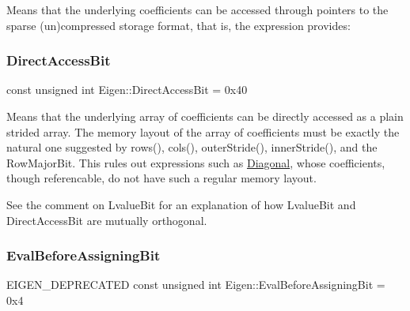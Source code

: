 Means that the underlying coefficients can be accessed through pointers to the sparse (un)compressed storage format, that is, the expression provides\+: 
\begin{DoxyCode}{0}
\end{DoxyCode}
 \mbox{\label{group__flags_gabf1e9d0516a933445a4c307ad8f14915}} 
\subsubsection{\texorpdfstring{DirectAccessBit}{DirectAccessBit}}
{\footnotesize\ttfamily const unsigned int Eigen\+::\+Direct\+Access\+Bit = 0x40}

Means that the underlying array of coefficients can be directly accessed as a plain strided array. The memory layout of the array of coefficients must be exactly the natural one suggested by rows(), cols(), outer\+Stride(), inner\+Stride(), and the Row\+Major\+Bit. This rules out expressions such as \mbox{\hyperlink{class_eigen_1_1_diagonal}{Diagonal}}, whose coefficients, though referencable, do not have such a regular memory layout.

See the comment on Lvalue\+Bit for an explanation of how Lvalue\+Bit and Direct\+Access\+Bit are mutually orthogonal. \mbox{\label{group__flags_ga0972b20dc004d13984e642b3bd12532e}} 
\subsubsection{\texorpdfstring{EvalBeforeAssigningBit}{EvalBeforeAssigningBit}}
{\footnotesize\ttfamily E\+I\+G\+E\+N\+\_\+\+D\+E\+P\+R\+E\+C\+A\+T\+ED const unsigned int Eigen\+::\+Eval\+Before\+Assigning\+Bit = 0x4}

